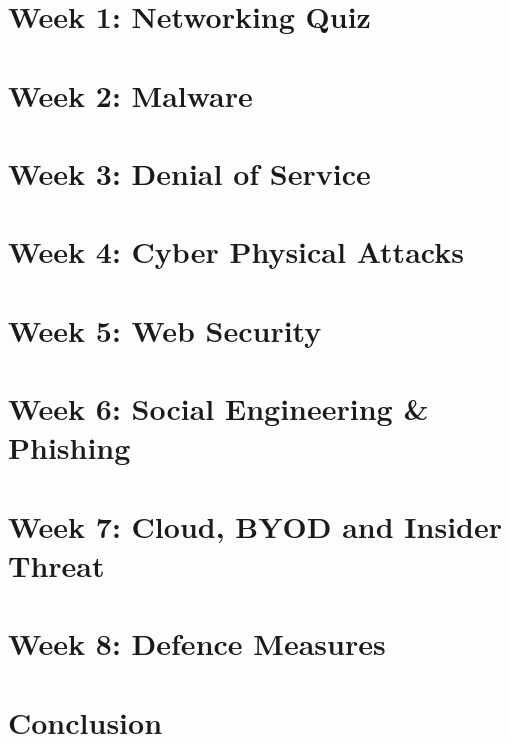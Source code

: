 \documentclass[oneside,openright,titlepage,numbers=noenddot,headinclude,footinclude=true,cleardoublepage=empty,listof=totoc,paper=a4,fontsize=11pt,english,BCOR=5mm]{scrreprt}
\begin{document}
  \frenchspacing
  \raggedbottom{}

  \pagestyle{plain}

  \singlespacing{}
  

  \onehalfspacing{}
  

  \cleardoublepage{}
  \pagestyle{scrheadings}
  \onehalfspacing{}

  \chapter{Week 1: Networking Quiz}\label{c:Week-1}
  

  \chapter{Week 2: Malware}\label{c:Week-2}
  

  \chapter{Week 3: Denial of Service}\label{c:Week-3}
  

  \chapter{Week 4: Cyber Physical Attacks}\label{c:Week-4}
  

  \chapter{Week 5: Web Security}\label{c:Week-5}
  

  \chapter{Week 6: Social Engineering \& Phishing}\label{c:Week-6}
  

  \chapter{Week 7: Cloud, BYOD and Insider Threat}\label{c:Week-7}
  

  \chapter{Week 8: Defence Measures}\label{c:Week-8}
  

  \chapter{Conclusion}\label{c:Conclusion}
  

  \cleardoublepage{}
  \appendix

  \singlespacing{}
  
  \cleardoublepage{}
\end{document}
